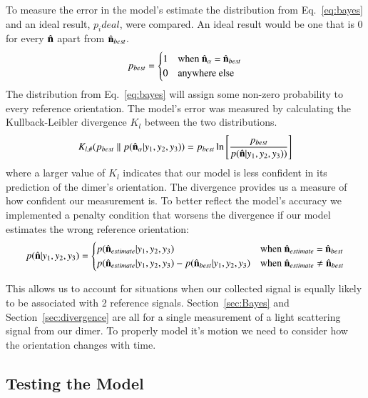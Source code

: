 \documentclass[final, 3p]{elsarticle}
\begin{document}
To measure the error in the model's estimate the distribution from
Eq.~\eqref{eq:bayes} and an ideal result, $p_ideal$, were compared.  An ideal result would be one that is 0 for every $\hat{\bf n}$ apart from $\hat{\bf n}_{best}$.
\begin{align}
	p_{best} = 
	\begin{cases}
		1 & \text{when $\hat{\bf n}_\alpha$ = $\hat{\bf n}_{best}$}\\
		0 & \text{anywhere else}
	\end{cases}
\end{align}
The distribution from Eq.~\eqref{eq:bayes} will assign some non-zero
probability to every reference orientation. The model's error was measured by calculating the Kullback-Leibler divergence $K_l$ between the two distributions.
\begin{align}
	K_{l, \#}(p_{best}\parallel p(\hat{\bf n}_\alpha| y_1, y_2, y_3))
	= p_{best}\ln \left[\frac{p_{best}}{p(\hat{\bf n}| y_1,y_2,y_3))}
	\right]
	\label{eq;kullback}
\end{align}
where a larger value of $K_l$ indicates that our model is less confident in its 
prediction of the dimer's orientation. The divergence provides us a measure of how confident our measurement is. To better reflect the model's accuracy we implemented a penalty condition that worsens the divergence if our model estimates the wrong reference orientation:
\begin{align}
	p(\hat{\bf n}|y_1,y_2,y_3) = 
	\begin{cases}
		p(\hat{\bf n}_{estimate}|y_1,y_2,y_3) & 
		\text{when $\hat{\bf n}_{estimate}$ = $\hat{\bf n}_{best}$}\\
		p(\hat{\bf n}_{estimate}|y_1,y_2,y_3)-p(\hat{\bf n}_{best}|y_1,y_2,y_3) & \text{when $\hat{\bf n}_{estimate} \ne \hat{\bf n}_{best}$}
	\end{cases}
\end{align}

This allows us to account for situations when our collected signal is equally likely to be associated with 2 reference signals. Section~\ref{sec:Bayes} and Section~\ref{sec:divergence} are all for a single measurement of a light scattering signal from our dimer. To properly model it's motion we need to consider how the orientation changes with time. 
\subsection{Testing the Model}
\label{sec:test}
\end{document}

